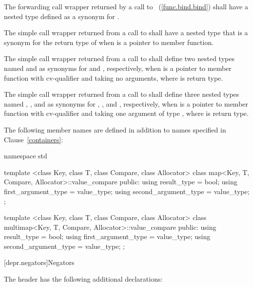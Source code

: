 \pnum
The forwarding call wrapper 
returned by a call to ~(\ref{func.bind.bind})
shall have a nested type  defined as a synonym for .

\pnum
The simple call wrapper
returned from a call to 
shall have a nested type 
that is a synonym for
the return type of 
when  is a pointer to member function.

\pnum
The simple call wrapper
returned from a call to 
shall define two nested types
named  and 
as synonyms for \cv{}  and , respectively,
when  is a pointer to member function
with cv-qualifier \cv{}
and taking no arguments,
where  is  return type.

\pnum
The simple call wrapper
returned from a call to 
shall define three nested types
named , , and 
as synonyms for \cv{} , , and , respectively,
when  is a pointer to member function
with cv-qualifier \cv{}
and taking one argument of type ,
where  is  return type.

\pnum
The following member names are defined in addition to names specified in Clause~\ref{containers}:

%
%
%
\begin{codeblock}
namespace std {
  template <class Key, class T, class Compare, class Allocator>
  class map<Key, T, Compare, Allocator>::value_compare {
  public:
    using result_type          = bool;
    using first_argument_type  = value_type;
    using second_argument_type = value_type;
  };

  template <class Key, class T, class Compare, class Allocator>
  class multimap<Key, T, Compare, Allocator>::value_compare {
  public:
    using result_type          = bool;
    using first_argument_type  = value_type;
    using second_argument_type = value_type;
  };
}
\end{codeblock}

[depr.negators]{Negators}

\pnum
The header  has the following additional declarations:

